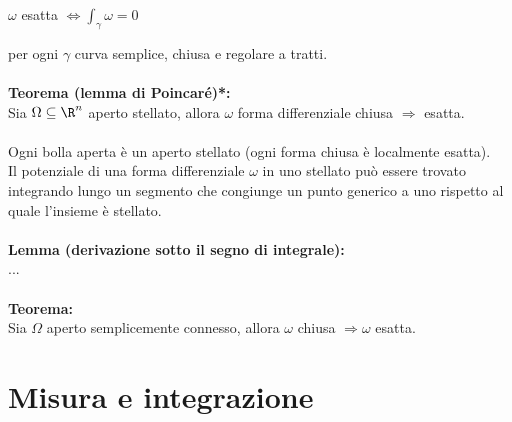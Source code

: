 \documentclass{article}
\begin{document}
\begin{center}
    $\omega$ esatta $\Leftrightarrow \int_\gamma\omega=0$
\end{center}
per ogni $\gamma$ curva semplice, chiusa e regolare a tratti.\\\\
\textbf{Teorema (lemma di Poincaré)*:}\\
Sia $\Omega\subseteq\R^n$ aperto stellato, allora $\omega$ forma differenziale chiusa $\Rightarrow$ esatta.\\\\
Ogni bolla aperta è un aperto stellato (ogni forma chiusa è localmente esatta).\\
Il potenziale di una forma differenziale $\omega$ in uno stellato può essere trovato integrando lungo un segmento che congiunge un punto generico a uno rispetto al quale l'insieme è stellato.\\\\
\textbf{Lemma (derivazione sotto il segno di integrale):}\\ ...\\\\
\textbf{Teorema:}\\
Sia $\Omega$ aperto semplicemente connesso, allora $\omega$ chiusa $\Rightarrow\omega$ esatta.




\newpage
\section{Misura e integrazione}
\end{document}
